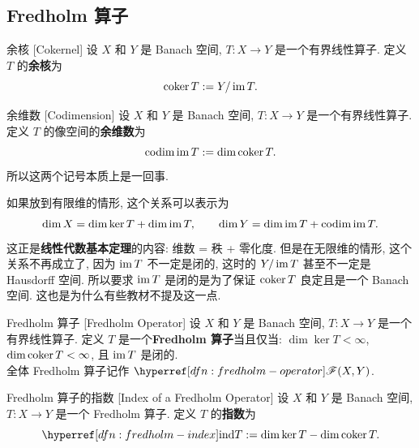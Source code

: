     \subsection{Fredholm 算子}

        \begin{dfn}
            [cokernel]
            {余核}
            [Cokernel]
            设 \(X\) 和 \(Y\) 是 Banach 空间, \(T:X\to Y\) 是一个有界线性算子. 定义 \(T\) 的\textbf{余核}为
            \[\operatorname{coker} T := Y/\operatorname{im} T.\]
        \end{dfn}

        \begin{dfn}
            {余维数}
            [Codimension]
            设 \(X\) 和 \(Y\) 是 Banach 空间, \(T:X\to Y\) 是一个有界线性算子. 定义 \(T\) 的像空间的\textbf{余维数}为
            \[\operatorname{codim}\operatorname{im} T := \dim\operatorname{coker} T.\]
            所以这两个记号本质上是一回事. 
        \end{dfn}

        \begin{rmk}
            [Dedicatia]
            如果放到有限维的情形, 这个关系可以表示为
            \[\dim X = \dim\ker T + \dim\operatorname{im} T, \qquad \dim Y = \dim\operatorname{im} T + \operatorname{codim}\operatorname{im} T.\]
            这正是\textbf{线性代数基本定理}的内容: 维数 = 秩 + 零化度. 但是在无限维的情形, 这个关系不再成立了, 因为 \(\operatorname{im} T\) 不一定是闭的, 这时的 \(Y/\operatorname{im} T\) 甚至不一定是 Hausdorff 空间. 所以要求 \(\operatorname{im} T\) 是闭的是为了保证 \(\operatorname{coker} T\) 良定且是一个 Banach 空间. 这也是为什么有些教材不提及这一点.
        \end{rmk}

        \begin{dfn}
            {Fredholm 算子}
            [Fredholm Operator]
            设 \(X\) 和 \(Y\) 是 Banach 空间, \(T:X\to Y\) 是一个有界线性算子. 定义 \(T\) 是一个\textbf{Fredholm 算子}当且仅当: \(\dim\ker T<\infty\), \(\dim\operatorname{coker} T<\infty\), 且 \(\operatorname{im} T\) 是闭的.\\
            全体 Fredholm 算子记作 \(\fred(X,Y)\).
        \end{dfn}

        \begin{dfn}
            {Fredholm 算子的指数}
            [Index of a Fredholm Operator]
            设 \(X\) 和 \(Y\) 是 Banach 空间, \(T:X\to Y\) 是一个 Fredholm 算子. 定义 \(T\) 的\textbf{指数}为
            \[\ind T := \dim\ker T - \dim\coker T.\]
        \end{dfn}

